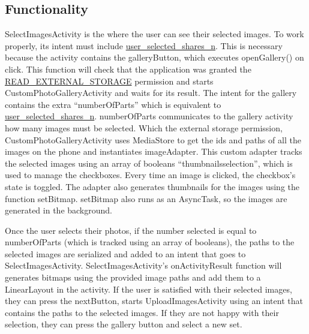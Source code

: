 \subsection{Functionality}

SelectImagesActivity is the where the user can see their selected images. To work properly, its intent must include \url{user_selected_shares_n}. This is necessary because the activity contains the galleryButton, which executes openGallery() on click.
This function will check that the application was granted the \url{READ_EXTERNAL_STORAGE} permission and starts CustomPhotoGalleryActivity and waits for its result.
The intent for the gallery contains the extra “numberOfParts” which is equivalent to \url{user_selected_shares_n}. numberOfParts communicates to the gallery activity how many images must be selected.
Which the external storage permission, CustomPhotoGalleryActivity uses MediaStore to get the ids and paths of all the images on the phone and instantiates imageAdapter.
This custom adapter tracks the selected images using an array of booleans “thumbnailsselection”, which is used to manage the checkboxes. Every time an image is clicked, the checkbox’s state is toggled.
The adapter also generates thumbnails for the images using the function setBitmap. setBitmap also runs as an AsyncTask, so the images are generated in the background.


  Once the user selects their photos, if the number selected is equal to numberOfParts (which is tracked using an array of booleans), the paths to the selected images are serialized and added to an intent that goes to SelectImagesActivity.
  SelectImagesActivity’s onActivityResult function will generates bitmaps using the provided image paths and add them to a LinearLayout in the activity. If the user is satisfied with their selected images, they can press the nextButton, starts UploadImagesActivity using an intent that contains the paths to the selected images.
  If they are not happy with their selection, they can press the gallery button and select a new set.


